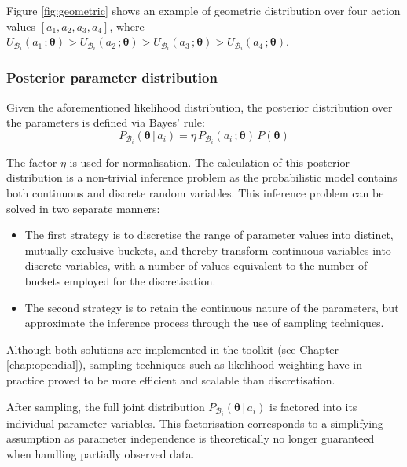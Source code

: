 Figure \ref{fig:geometric} shows an example of geometric distribution over four action values $[a_1, a_2, a_3, a_4]$, where $U_{\mathcal{B}_i}(a_1\,; \boldsymbol\theta) > U_{\mathcal{B}_i}(a_2\,; \boldsymbol\theta) > U_{\mathcal{B}_i}(a_3\,; \boldsymbol\theta) > U_{\mathcal{B}_i}(a_4\,; \boldsymbol\theta)$.


\subsubsection*{Posterior parameter distribution}
Given the aforementioned likelihood distribution, the posterior distribution over the parameters is defined via Bayes' rule: 
\begin{equation}
P_{\mathcal{B}_i}(\boldsymbol\theta \, | \, a_i) = \eta \, P_{\mathcal{B}_i}(a_i\,; \boldsymbol\theta) \, P(\boldsymbol\theta ) \label{eq:paramposterior}
\end{equation}

The factor $\eta$ is used for normalisation. The calculation of this posterior distribution is a non-trivial inference problem as the probabilistic model contains both continuous and discrete random variables.  This inference problem can be solved in two separate manners: \begin{itemize}
\item The first strategy is to discretise the range of parameter values into distinct, mutually exclusive buckets, and thereby transform continuous variables into discrete variables, with a number of values equivalent to the number of buckets employed for the discretisation.
\item The second strategy is to retain the continuous nature of the parameters, but approximate the inference process through the use of sampling techniques.  
\end{itemize}
Although both solutions are implemented in the \opendial{} toolkit (see Chapter \ref{chap:opendial}), sampling techniques such as likelihood weighting have in practice proved to be more efficient and scalable than discretisation. 

After sampling, the full joint distribution $P_{\mathcal{B}_i}(\boldsymbol\theta \, | \, a_i)$ is factored into its individual parameter variables. This factorisation corresponds to a simplifying assumption as parameter independence is theoretically no longer guaranteed when handling partially observed data. 

